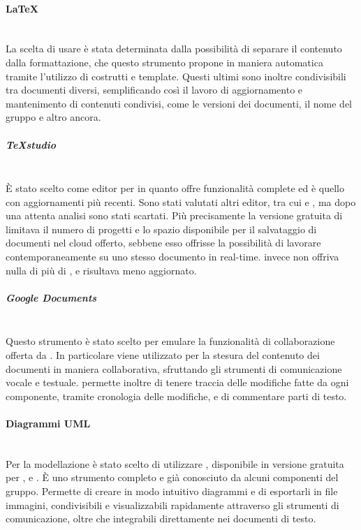 \paragraph{\LaTeX}\mbox{}\\
La scelta di usare \glossario{\LaTeX{}} è stata determinata dalla possibilità di separare il contenuto dalla formattazione, che questo strumento propone in maniera automatica tramite l'utilizzo di costrutti e template. Questi ultimi sono inoltre condivisibili tra documenti diversi, semplificando così il lavoro di aggiornamento e mantenimento di contenuti condivisi, come le versioni dei documenti, il nome del gruppo e altro ancora.

\subparagraph{TeXstudio}\mbox{}\\
\`{E} stato scelto  come editor per \glossario{\LaTeX{}} in quanto offre funzionalità complete ed è quello con aggiornamenti più recenti. Sono stati valutati altri editor, tra cui  e , ma dopo una attenta analisi sono stati scartati. Più precisamente la versione gratuita di  limitava il numero di progetti e lo spazio disponibile per il salvataggio di documenti nel cloud offerto, sebbene esso offrisse la possibilità di lavorare contemporaneamente su uno stesso documento in real-time.  invece non offriva nulla di più di , e risultava meno aggiornato.

\subparagraph{Google Documents}\mbox{}\\
Questo strumento è stato scelto per emulare la funzionalità di collaborazione offerta da . In particolare viene utilizzato per la stesura del contenuto dei documenti in maniera collaborativa, sfruttando gli strumenti di comunicazione vocale e testuale.  permette inoltre di tenere traccia delle modifiche fatte da ogni componente, tramite cronologia delle modifiche, e di commentare parti di testo. 

\paragraph{Diagrammi UML}\mbox{}\\
Per la modellazione  è stato scelto di utilizzare \textbf{}, disponibile in versione gratuita per ,  e . \`{E} uno strumento completo e già conosciuto da alcuni componenti del gruppo. Permette di creare in modo intuitivo diagrammi  e di esportarli in file immagini, condivisibili e visualizzabili rapidamente attraverso gli strumenti di comunicazione, oltre che integrabili direttamente nei documenti di testo.

